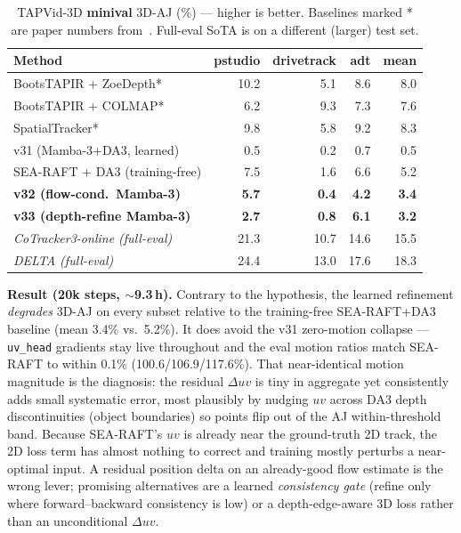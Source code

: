 \documentclass[11pt,a4paper]{article}
\begin{document}
\begin{table}[h]
\centering
\caption{TAPVid-3D \textbf{minival} 3D-AJ (\%) — higher is better.
Baselines marked * are paper numbers from~\protect\cite{tapvid3d}.
Full-eval SoTA is on a different (larger) test set.}
\label{tab:results}
\begin{tabular}{lrrrr}
\toprule
Method & pstudio & drivetrack & adt & mean \\
\midrule
BootsTAPIR + ZoeDepth*   & 10.2 & 5.1  & 8.6  & 8.0 \\
BootsTAPIR + COLMAP*     & 6.2  & 9.3  & 7.3  & 7.6 \\
SpatialTracker*          & 9.8  & 5.8  & 9.2  & 8.3 \\
\midrule
v31 (Mamba-3+DA3, learned)    & 0.5  & 0.2  & 0.7  & 0.5 \\
SEA-RAFT + DA3 (training-free) & 7.5  & 1.6  & 6.6  & 5.2 \\
\textbf{v32 (flow-cond.\ Mamba-3)} &
  \textbf{5.7}  & \textbf{0.4}  & \textbf{4.2}  & \textbf{3.4} \\
\textbf{v33 (depth-refine Mamba-3)} &
  \textbf{2.7}  & \textbf{0.8}  & \textbf{6.1}  & \textbf{3.2} \\
\midrule
\textit{CoTracker3-online (full-eval)} & 21.3 & 10.7 & 14.6 & 15.5 \\
\textit{DELTA (full-eval)}             & 24.4 & 13.0 & 17.6 & 18.3 \\
\bottomrule
\end{tabular}
\end{table}

\noindent \textbf{Result (20k steps, $\sim$9.3\,h).} Contrary to the
hypothesis, the learned refinement \emph{degrades} 3D-AJ on every subset
relative to the training-free SEA-RAFT+DA3 baseline (mean 3.4\% vs.\ 5.2\%).
It does avoid the v31 zero-motion collapse — \texttt{uv\_head} gradients stay
live throughout and the eval motion ratios match SEA-RAFT to within 0.1\%
(100.6/106.9/117.6\%). That near-identical motion magnitude is the diagnosis:
the residual $\Delta uv$ is tiny in aggregate yet consistently adds small
systematic error, most plausibly by nudging $uv$ across DA3 depth
discontinuities (object boundaries) so points flip out of the AJ
within-threshold band. Because SEA-RAFT's $uv$ is already near the ground-truth
2D track, the 2D loss term has almost nothing to correct and training mostly
perturbs a near-optimal input. A residual position delta on an already-good
flow estimate is the wrong lever; promising alternatives are a learned
\emph{consistency gate} (refine only where forward–backward consistency is low)
or a depth-edge-aware 3D loss rather than an unconditional $\Delta uv$.
\end{document}
